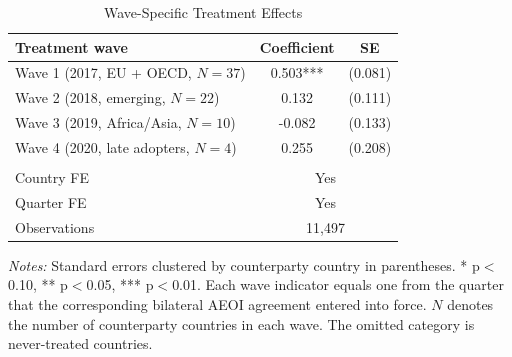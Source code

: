 \begin{table}[H]
\centering
\caption{Wave-Specific Treatment Effects}
\label{tab:waves}
\begin{threeparttable}
\begin{tabular}{lcc}
\toprule
Treatment wave & Coefficient & SE \\
\midrule
Wave 1 (2017, EU + OECD, $N = 37$) & 0.503*** & (0.081) \\
Wave 2 (2018, emerging, $N = 22$) & 0.132 & (0.111) \\
Wave 3 (2019, Africa/Asia, $N = 10$) & -0.082 & (0.133) \\
Wave 4 (2020, late adopters, $N = 4$) & 0.255 & (0.208) \\
\\
Country FE & \multicolumn{2}{c}{Yes} \\
Quarter FE & \multicolumn{2}{c}{Yes} \\
Observations & \multicolumn{2}{c}{11,497} \\
\bottomrule
\end{tabular}
\begin{tablenotes}[flushleft]
\small
\item \textit{Notes:} Standard errors clustered by counterparty country in parentheses. * p$<$0.10, ** p$<$0.05, *** p$<$0.01. Each wave indicator equals one from the quarter that the corresponding bilateral AEOI agreement entered into force. $N$ denotes the number of counterparty countries in each wave. The omitted category is never-treated countries.
\end{tablenotes}
\end{threeparttable}
\end{table}
